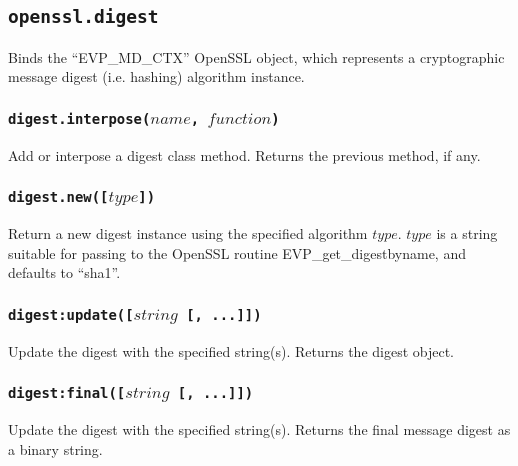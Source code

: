 \documentclass[11pt, oneside]{memoir}
\newcommand*{\fn}[1]{\texttt{#1}\xspace}
\newcounter{toccols}
\newenvironment{Module}[1]{
	\subsection{\texttt{#1}}
	\addtocontents{toc}{
		\protect\begin{multicols}{\value{toccols}}
	}
}{
	\addtocontents{toc}{\protect\end{multicols}}
}
\begin{document}
\begin{Module}{openssl.digest}

Binds the ``EVP\_MD\_CTX'' OpenSSL object, which represents a cryptographic message digest (i.e. hashing) algorithm instance.

\subsubsection[\fn{digest.interpose}]{\fn{digest.interpose($name$, $function$)}}

Add or interpose a digest class method. Returns the previous method, if any.

\subsubsection[\fn{digest.new}]{\fn{digest.new([$type$])}}

Return a new digest instance using the specified algorithm $type$. $type$ is a string suitable for passing to the OpenSSL routine EVP\_get\_digestbyname, and defaults to ``sha1''.

\subsubsection[\fn{digest:update}]{\fn{digest:update([$string$ [, ...]])}}

Update the digest with the specified string(s). Returns the digest object.

\subsubsection[\fn{digest:final}]{\fn{digest:final([$string$ [, ...]])}}

Update the digest with the specified string(s). Returns the final message digest as a binary string.

\end{Module}
\end{document}
